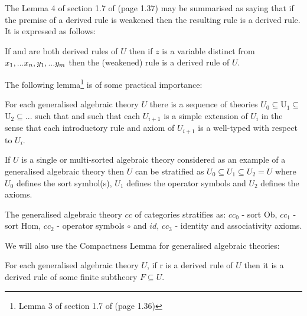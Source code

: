 The Lemma 4 of section 1.7 of \cite{Cartmell78} (page 1.37) may be summarised as saying that if the premise of a derived rule is weakened then the resulting rule is a derived rule. It is expressed as follows:
\begin{lemma}
If
  and
 are both derived rules of $U$ then if $z$ is a variable
distinct from $x_1,...x_n,y_1,...y_m$ then
the (weakened) rule  is a derived rule
of $U$.
\end{lemma}


 The following lemma\footnote{Lemma 3 of section 1.7 of \cite{Cartmell78} (page 1.36)} is of some practical importance:
\begin{lemma}
 For each generalised algebraic theory $U$  there is a sequence of theories 
$U_0 \subseteq $U$_1 \subseteq $U$_2 \subseteq ...$ such that  
and such that each $U_{i+1}$ is a simple extension of $U_i$ in the sense that each introductory rule and axiom of $U_{i+1}$ is a well-typed  with respect to $U_i$.
\end{lemma}

\begin{example}
If $U$ is a single or multi-sorted algebraic theory considered as an example of a
 generalised algebraic theory then $U$ can be stratified as $U_0 \subseteq U_1 \subseteq U_2=U$
where $U_0$ defines the sort symbol(s), $U_1$ defines the operator symbols and $U_2$ defines the axioms. 
\end{example}

\begin{example}
 The generalised algebraic theory $cc$ of categories stratifies as: $cc_0$ - sort Ob,
$cc_1$ - sort Hom, $cc_2$ - operator symbols $\circ$ and $id$, $cc_3$ - identity and associativity axioms.
\end{example} 

 We will also use the Compactness Lemma for generalised algebraic theories:
\begin{lemma}
For each generalised algebraic theory $U$, if r is a derived rule of $U$ then it is a derived rule of some finite subtheory $F \subseteq U$. \
\end{lemma}



